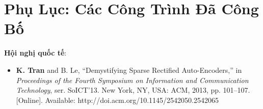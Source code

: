 \newpage
\chapter*{Phụ Lục: Các Công Trình Đã Công Bố}
\textbf{Hội nghị quốc tế}:
\begin{itemize}
	\item \textbf{K. Tran} and B. Le, ``Demystifying Sparse Rectified Auto-Encoders,'' in \emph{Proceedings of the Fourth Symposium on Information and Communication Technology}, ser. SoICT'13. New York, NY, USA: ACM, 2013, pp. 101–107. [Online]. Available: http://doi.acm.org/10.1145/2542050.2542065 
\end{itemize}


